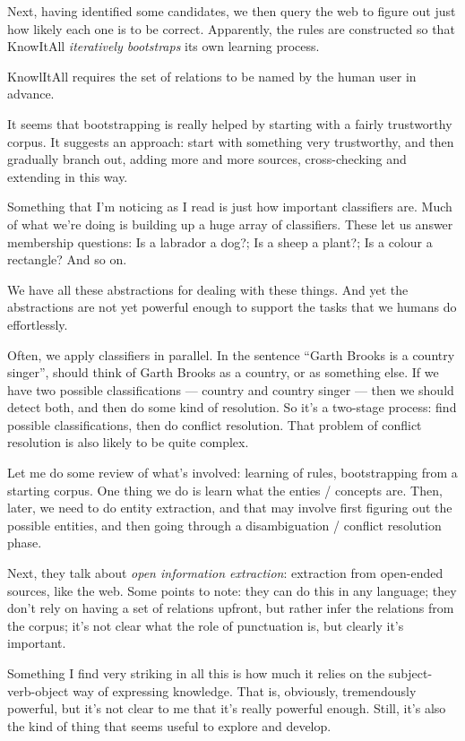 Next, having identified some candidates, we then query the web to
figure out just how likely each one is to be correct.  Apparently, the
rules are constructed so that KnowItAll \emph{iteratively bootstraps}
its own learning process.

KnowlItAll requires the set of relations to be named by the human user
in advance.  

It seems that bootstrapping is really helped by starting with a fairly
trustworthy corpus.  It suggests an approach: start with something
very trustworthy, and then gradually branch out, adding more and more
sources, cross-checking and extending in this way. 

Something that I'm noticing as I read is just how important
classifiers are.  Much of what we're doing is building up a huge array
of classifiers.  These let us answer membership questions: Is a
labrador a dog?; Is a sheep a plant?; Is a colour a rectangle?  And so
on.

We have all these abstractions for dealing with these things.  And yet
the abstractions are not yet powerful enough to support the tasks that
we humans do effortlessly.

Often, we apply classifiers in parallel.  In the sentence ``Garth
Brooks is a country singer'', should think of Garth Brooks as a
country, or as something else.  If we have two possible
classifications --- country and country singer --- then we should
detect both, and then do some kind of resolution.  So it's a two-stage
process: find possible classifications, then do conflict resolution.
That problem of conflict resolution is also likely to be quite
complex.

Let me do some review of what's involved: learning of rules,
bootstrapping from a starting corpus.  One thing we do is learn what
the enties / concepts are.  Then, later, we need to do entity
extraction, and that may involve first figuring out the possible
entities, and then going through a disambiguation / conflict
resolution phase.

Next, they talk about \emph{open information extraction}: extraction
from open-ended sources, like the web.  Some points to note: they can
do this in any language; they don't rely on having a set of relations
upfront, but rather infer the relations from the corpus; it's not
clear what the role of punctuation is, but clearly it's important.

Something I find very striking in all this is how much it relies on
the subject-verb-object way of expressing knowledge.  That is,
obviously, tremendously powerful, but it's not clear to me that it's
really powerful enough.  Still, it's also the kind of thing that seems
useful to explore and develop.

